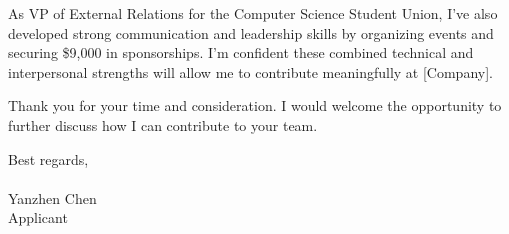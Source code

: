 \documentclass[letterpaper,11pt]{article}
\begin{document}
\vspace{10pt}

As VP of External Relations for the Computer Science Student Union, I’ve also developed strong communication and leadership skills by organizing events and securing \$9,000 in sponsorships. I’m confident these combined technical and interpersonal strengths will allow me to contribute meaningfully at [Company].

\vspace{10pt}

Thank you for your time and consideration. I would welcome the opportunity to further discuss how I can contribute to your team.
\vfill
\begin{flushright}

Best regards,\\
[Signature]\\
Yanzhen Chen\\
Applicant
\end{flushright}
\end{document}

